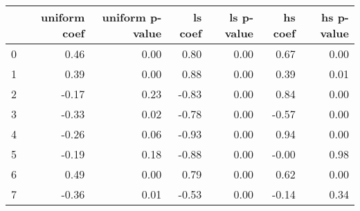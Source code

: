 \begin{tabular}{lrrrrrr}
\toprule
 & uniform coef & uniform p-value & ls coef & ls p-value & hs coef & hs p-value \\
\midrule
0 & 0.46 & 0.00 & 0.80 & 0.00 & 0.67 & 0.00 \\
1 & 0.39 & 0.00 & 0.88 & 0.00 & 0.39 & 0.01 \\
2 & -0.17 & 0.23 & -0.83 & 0.00 & 0.84 & 0.00 \\
3 & -0.33 & 0.02 & -0.78 & 0.00 & -0.57 & 0.00 \\
4 & -0.26 & 0.06 & -0.93 & 0.00 & 0.94 & 0.00 \\
5 & -0.19 & 0.18 & -0.88 & 0.00 & -0.00 & 0.98 \\
6 & 0.49 & 0.00 & 0.79 & 0.00 & 0.62 & 0.00 \\
7 & -0.36 & 0.01 & -0.53 & 0.00 & -0.14 & 0.34 \\
\bottomrule
\end{tabular}
